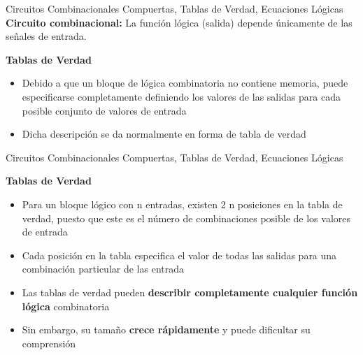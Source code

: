 \documentclass[aspectratio=169,compress]{beamer}
\begin{document}
\begin{footnotesize}
\begin{frame} {Circuitos Combinacionales} {Compuertas, Tablas de Verdad, Ecuaciones Lógicas}
\bigskip
\textbf{Circuito combinacional:} La función lógica (salida) depende únicamente de las señales de entrada.
\bigskip
\begin{center}\textbf{Tablas de Verdad}\end{center}
\begin{itemize}
\item Debido a que un bloque de lógica combinatoria 
no contiene memoria, puede especificarse 
completamente definiendo los valores de las 
salidas para cada posible conjunto de valores 
de entrada
\item 
Dicha descripción se da normalmente en forma 
de 
tabla de verdad

\end{itemize}
\end{frame}




\begin{frame} {Circuitos Combinacionales} {Compuertas, Tablas de Verdad, Ecuaciones Lógicas}
\begin{center}\textbf{Tablas de Verdad}\end{center}
\begin{itemize}
\item Para un bloque lógico con n entradas, existen   2 n posiciones en la tabla de verdad, puesto que 
este es el número de combinaciones posible de 
los valores de entrada
\item Cada posición en la tabla especifica el valor de 
todas las salidas para una combinación 
particular de las entrada
\item Las tablas de verdad pueden \textbf{describir 
completamente cualquier función lógica} 
combinatoria
\item Sin embargo, su tamaño \textbf{crece rápidamente} y 
puede dificultar su comprensión

\end{itemize}
\end{frame}


%
%












\end{footnotesize}
\end{document}
